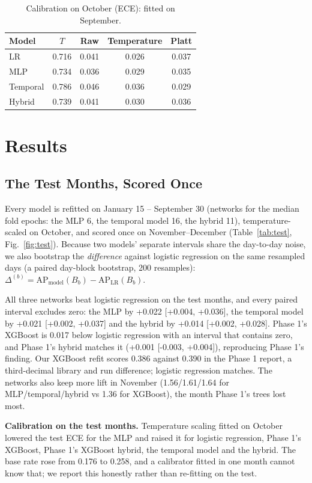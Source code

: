 \documentclass[conference]{IEEEtran}
\begin{document}
\begin{table}[t]\centering\caption{Calibration on October (ECE): fitted on September.}\label{tab:calib}
\setlength{\tabcolsep}{3pt}\footnotesize\begin{tabular}{lcccc}\toprule
Model & $T$ & Raw & Temperature & Platt\\\midrule
LR & 0.716 & 0.041 & 0.026 & 0.037\\
MLP & 0.734 & 0.036 & 0.029 & 0.035\\
Temporal & 0.786 & 0.046 & 0.036 & 0.029\\
Hybrid & 0.739 & 0.041 & 0.030 & 0.036\\
\bottomrule\end{tabular}\end{table}

\section{Results}
\subsection{The Test Months, Scored Once}
Every model is refitted on January 15 -- September 30 (networks for the median fold epochs: the MLP 6, the temporal model 16, the hybrid 11), temperature-scaled on October, and scored once on November--December (Table~\ref{tab:test}, Fig.~\ref{fig:test}). Because two models' separate intervals share the day-to-day noise, we also bootstrap the \emph{difference} against logistic regression on the same resampled days (a paired day-block bootstrap, 200 resamples): $\Delta^{(b)} = \mathrm{AP}_{\text{model}}(B_b) - \mathrm{AP}_{\text{LR}}(B_b)$.

All three networks beat logistic regression on the test months, and every paired interval excludes zero: the MLP by +0.022 [+0.004, +0.036], the temporal model by +0.021 [+0.002, +0.037] and the hybrid by +0.014 [+0.002, +0.028]. Phase 1's XGBoost is 0.017 below logistic regression with an interval that contains zero, and Phase 1's hybrid matches it (+0.001 [-0.003, +0.004]), reproducing Phase 1's finding. Our XGBoost refit scores 0.386 against 0.390 in the Phase 1 report, a third-decimal library and run difference; logistic regression matches. The networks also keep more lift in November (1.56/1.61/1.64 for MLP/temporal/hybrid vs 1.36 for XGBoost), the month Phase 1's trees lost most.

\textbf{Calibration on the test months.} Temperature scaling fitted on October lowered the test ECE for the MLP and raised it for logistic regression, Phase 1's XGBoost, Phase 1's XGBoost hybrid, the temporal model and the hybrid. The base rate rose from 0.176 to 0.258, and a calibrator fitted in one month cannot know that; we report this honestly rather than re-fitting on the test.
\end{document}
